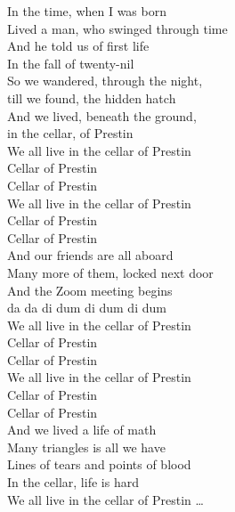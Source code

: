 \documentclass[oneside]{memoir}
\begin{document}
\begin{singlespace}
\bigskip
\noindent 
\glqq In the time, when I was born \\
Lived a man, who swinged through time \\

\noindent
And he told us of first life \\
In the fall of twenty-nil \\

\noindent
So we wandered, through the night, \\
till we found, the hidden hatch \\

\noindent
And we lived, beneath the ground, \\
in the cellar, of Prestin \\

\noindent 
We all live in the cellar of Prestin \\
Cellar of Prestin \\
Cellar of Prestin \\
We all live in the cellar of Prestin \\
Cellar of Prestin \\
Cellar of Prestin \\

\noindent 
And our friends are all aboard \\
Many more of them, locked next door \\

\noindent
And the Zoom meeting begins \\
da da di dum di dum di dum \\

\noindent 
We all live in the cellar of Prestin \\
Cellar of Prestin \\
Cellar of Prestin \\
We all live in the cellar of Prestin \\
Cellar of Prestin \\
Cellar of Prestin \\

\noindent 
And we lived a life of math \\
Many triangles is all we have \\

\noindent
Lines of tears and points of blood \\
In the cellar, life is hard \\ 

\noindent 
We all live in the cellar of Prestin \ldots\grqq \\
\end{singlespace}
\end{document}
